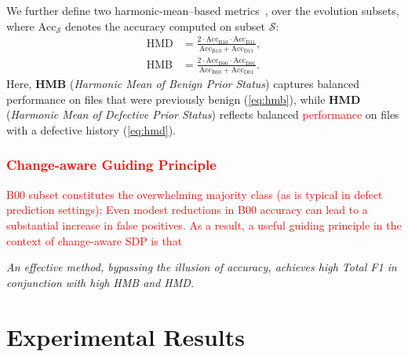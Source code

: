 \documentclass[authoryear,final,5p,times,twocolumn]{elsarticle}
\theoremstyle{plain}
\begin{document}
We further define two harmonic-mean–based metrics~\citep{christen2023review, sokolova2009systematic, tharwat2021classification}, 
over the evolution subsets, where \(\mathrm{Acc}_{\mathcal{S}}\) denotes the accuracy computed on subset \(\mathcal{S}\):
\begin{align}
\text{HMD} &=
\frac{2 \cdot \mathrm{Acc}_{\mathrm{B10}} \cdot \mathrm{Acc}_{\mathrm{D11}}}
{\mathrm{Acc}_{\mathrm{B10}} + \mathrm{Acc}_{\mathrm{D11}}}, \label{eq:hmb} \\
\text{HMB} &=
\frac{2 \cdot \mathrm{Acc}_{\mathrm{B00}} \cdot \mathrm{Acc}_{\mathrm{D01}}}
{\mathrm{Acc}_{\mathrm{B00}} + \mathrm{Acc}_{\mathrm{D01}}}. \label{eq:hmd}
\end{align}
Here, \textbf{HMB} (\emph{Harmonic Mean of Benign Prior Status}) captures balanced performance on files that were previously benign (\autoref{eq:hmb}), while \textbf{HMD} (\emph{Harmonic Mean of Defective Prior Status}) reflects balanced \textcolor{red}{performance} on files with a defective history (\autoref{eq:hmd}).

\subsubsection{\textcolor{red}{Change-aware Guiding Principle}}
\label{sec:guiding_principle}
\textcolor{red}{B00 subset constitutes the overwhelming majority class (as is typical in defect prediction settings); Even modest reductions in B00 accuracy can lead to a substantial increase in false positives. As a result, a useful guiding principle in the context of change-aware SDP is that}

\begin{boxnote}
\emph{An effective method, bypassing the illusion of accuracy, achieves high Total F1 in conjunction with high HMB and HMD.}
\end{boxnote}

\section{Experimental Results}
\label{sec:results}
\end{document}
